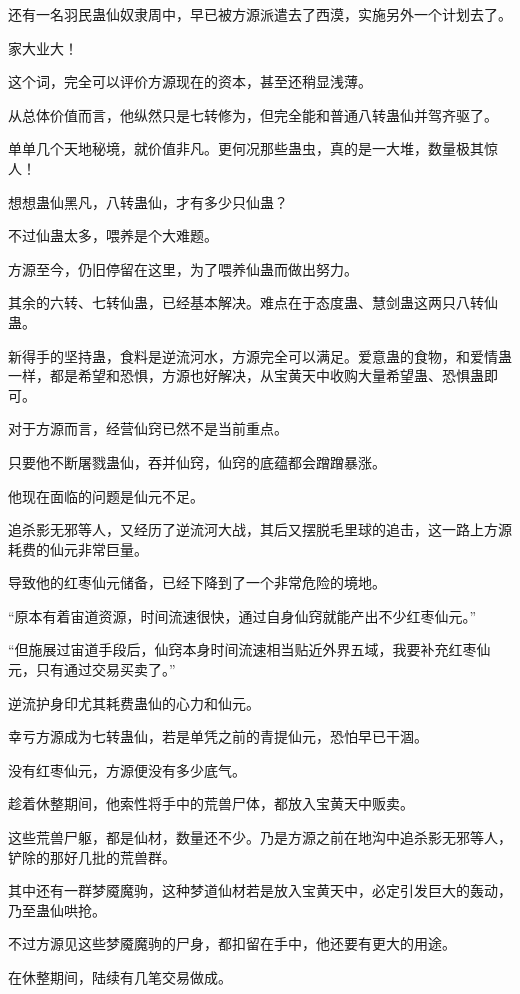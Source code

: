 \begin{this_body}
还有一名羽民蛊仙奴隶周中，早已被方源派遣去了西漠，实施另外一个计划去了。

家大业大！

这个词，完全可以评价方源现在的资本，甚至还稍显浅薄。

从总体价值而言，他纵然只是七转修为，但完全能和普通八转蛊仙并驾齐驱了。

单单几个天地秘境，就价值非凡。更何况那些蛊虫，真的是一大堆，数量极其惊人！

想想蛊仙黑凡，八转蛊仙，才有多少只仙蛊？

不过仙蛊太多，喂养是个大难题。

方源至今，仍旧停留在这里，为了喂养仙蛊而做出努力。

其余的六转、七转仙蛊，已经基本解决。难点在于态度蛊、慧剑蛊这两只八转仙蛊。

新得手的坚持蛊，食料是逆流河水，方源完全可以满足。爱意蛊的食物，和爱情蛊一样，都是希望和恐惧，方源也好解决，从宝黄天中收购大量希望蛊、恐惧蛊即可。

对于方源而言，经营仙窍已然不是当前重点。

只要他不断屠戮蛊仙，吞并仙窍，仙窍的底蕴都会蹭蹭暴涨。

他现在面临的问题是仙元不足。

追杀影无邪等人，又经历了逆流河大战，其后又摆脱毛里球的追击，这一路上方源耗费的仙元非常巨量。

导致他的红枣仙元储备，已经下降到了一个非常危险的境地。

“原本有着宙道资源，时间流速很快，通过自身仙窍就能产出不少红枣仙元。”

“但施展过宙道手段后，仙窍本身时间流速相当贴近外界五域，我要补充红枣仙元，只有通过交易买卖了。”

逆流护身印尤其耗费蛊仙的心力和仙元。

幸亏方源成为七转蛊仙，若是单凭之前的青提仙元，恐怕早已干涸。

没有红枣仙元，方源便没有多少底气。

趁着休整期间，他索性将手中的荒兽尸体，都放入宝黄天中贩卖。

这些荒兽尸躯，都是仙材，数量还不少。乃是方源之前在地沟中追杀影无邪等人，铲除的那好几批的荒兽群。

其中还有一群梦魇魔驹，这种梦道仙材若是放入宝黄天中，必定引发巨大的轰动，乃至蛊仙哄抢。

不过方源见这些梦魇魔驹的尸身，都扣留在手中，他还要有更大的用途。

在休整期间，陆续有几笔交易做成。


\end{this_body}
